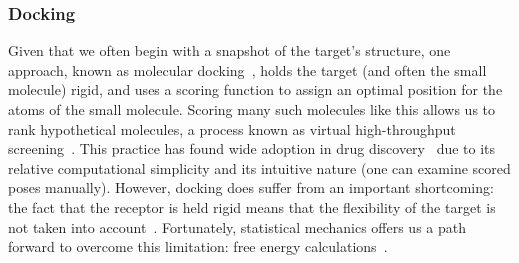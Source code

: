 \subsubsection{Docking}
%
Given that we often begin with a snapshot of the target's structure, one approach, known as molecular docking~\cite{Shoichet2002, Cheng2012}, holds the target (and often the small molecule) rigid, and uses a scoring function to assign an optimal position for the atoms of the small molecule.
%
Scoring many such molecules like this allows us to rank hypothetical molecules, a process known as virtual high-throughput screening~\cite{Shoichet2004}.
%
This practice has found wide adoption in drug discovery~\cite{Shoichet2004} due to its relative computational simplicity and its intuitive nature (one can examine scored poses manually).
%
However, docking does suffer from an important shortcoming: the fact that the receptor is held rigid means that the flexibility of the target is not taken into account~\cite{warren2006}.
%
Fortunately, statistical mechanics offers us a path forward to overcome this limitation: free energy calculations~\cite{Gilson1997}.
%
